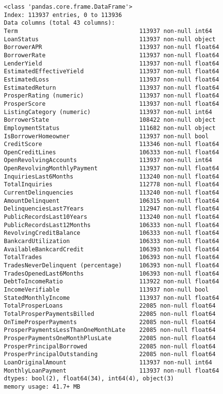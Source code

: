 \documentclass[11pt]{article}
\begin{document}
    \begin{Verbatim}[commandchars=\\\{\}]
<class 'pandas.core.frame.DataFrame'>
Index: 113937 entries, 0 to 113936
Data columns (total 43 columns):
Term                                   113937 non-null int64
LoanStatus                             113937 non-null object
BorrowerAPR                            113937 non-null float64
BorrowerRate                           113937 non-null float64
LenderYield                            113937 non-null float64
EstimatedEffectiveYield                113937 non-null float64
EstimatedLoss                          113937 non-null float64
EstimatedReturn                        113937 non-null float64
ProsperRating (numeric)                113937 non-null float64
ProsperScore                           113937 non-null float64
ListingCategory (numeric)              113937 non-null int64
BorrowerState                          108422 non-null object
EmploymentStatus                       111682 non-null object
IsBorrowerHomeowner                    113937 non-null bool
CreditScore                            113346 non-null float64
OpenCreditLines                        106333 non-null float64
OpenRevolvingAccounts                  113937 non-null int64
OpenRevolvingMonthlyPayment            113937 non-null float64
InquiriesLast6Months                   113240 non-null float64
TotalInquiries                         112778 non-null float64
CurrentDelinquencies                   113240 non-null float64
AmountDelinquent                       106315 non-null float64
DelinquenciesLast7Years                112947 non-null float64
PublicRecordsLast10Years               113240 non-null float64
PublicRecordsLast12Months              106333 non-null float64
RevolvingCreditBalance                 106333 non-null float64
BankcardUtilization                    106333 non-null float64
AvailableBankcardCredit                106393 non-null float64
TotalTrades                            106393 non-null float64
TradesNeverDelinquent (percentage)     106393 non-null float64
TradesOpenedLast6Months                106393 non-null float64
DebtToIncomeRatio                      113922 non-null float64
IncomeVerifiable                       113937 non-null bool
StatedMonthlyIncome                    113937 non-null float64
TotalProsperLoans                      22085 non-null float64
TotalProsperPaymentsBilled             22085 non-null float64
OnTimeProsperPayments                  22085 non-null float64
ProsperPaymentsLessThanOneMonthLate    22085 non-null float64
ProsperPaymentsOneMonthPlusLate        22085 non-null float64
ProsperPrincipalBorrowed               22085 non-null float64
ProsperPrincipalOutstanding            22085 non-null float64
LoanOriginalAmount                     113937 non-null int64
MonthlyLoanPayment                     113937 non-null float64
dtypes: bool(2), float64(34), int64(4), object(3)
memory usage: 41.7+ MB

    \end{Verbatim}
\end{document}
